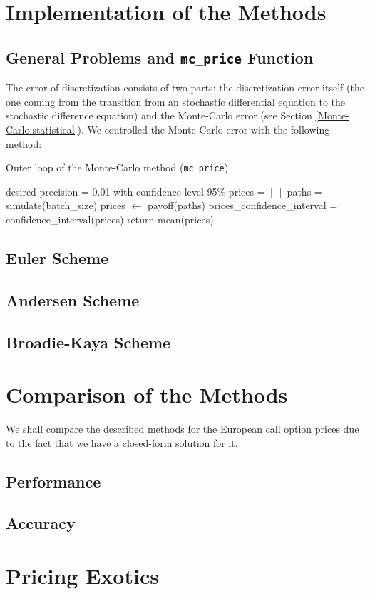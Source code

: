 \chapter{Implementation of the Methods}
    \section{General Problems and \texttt{mc\_price} Function}
        The error of discretization consists of two parts: the discretization error itself 
        (the one coming from the transition from an stochastic differential equation to the 
        stochastic difference equation) and the Monte-Carlo error (see Section \ref{Monte-Carlo:statistical}).
        We controlled the Monte-Carlo error with the following method:
        \begin{algorithm}
            \caption{Outer loop of the Monte-Carlo method (\texttt{mc\_price})}
            \label{alg:outer_loop}
            \begin{algorithmic}
                \State desired precision = 0.01 with confidence level 95\%
                \State prices = $\left[ \ \right]$
                    \State paths = simulate(batch\_size)
                    \State prices $\gets$ payoff(paths)
                    \State prices\_confidence\_interval = confidence\_interval(prices)
                \EndWhile
                \State return mean(prices)
            \end{algorithmic}
        \end{algorithm}



    \section{Euler Scheme}

    \section{Andersen Scheme}

    \section{Broadie-Kaya Scheme}


\chapter{Comparison of the Methods}
    We shall compare the described methods for the European call option prices due to the fact that we have a closed-form solution for it.
    \section{Performance}

    \section{Accuracy}

\chapter{Pricing Exotics}